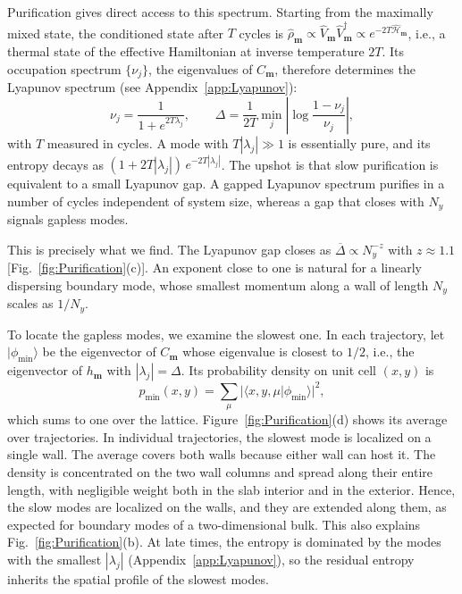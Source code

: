 \documentclass[aps,prb,twocolumn,superscriptaddress,longbibliography,floatfix]{revtex4-2}
\newcommand{\mc}[1]{\mathcal{#1}}
\newcommand{\bs}[1]{\boldsymbol{#1}}
\newcommand{\rec}{\bs m}   %
\begin{document}
Purification gives direct access to this spectrum. Starting from the maximally mixed state, the conditioned state after $T$ cycles is $\hat\rho_{\rec}\propto\hat V_{\rec}\hat V_{\rec}^\dagger\propto e^{-2T\hat{\mc H}_{\rec}}$, i.e., a thermal state of the effective Hamiltonian at inverse temperature $2T$. Its occupation spectrum $\{\nu_j\}$, the eigenvalues of $C_{\rec}$, therefore determines the Lyapunov spectrum (see Appendix~\ref{app:Lyapunov}):
\begin{equation}
    \nu_j=\frac{1}{1+e^{2T\lambda_j}},
    \qquad
    \Delta=\frac{1}{2T}\min_j\left|\log\frac{1-\nu_j}{\nu_j}\right|,
    \label{eq:LyapunovFromOccupations}
\end{equation}
with $T$ measured in cycles. A mode with $T|\lambda_j|\gg1$ is essentially pure, and its entropy decays as $(1+2T|\lambda_j|)\,e^{-2T|\lambda_j|}$. The upshot is that slow purification is equivalent to a small Lyapunov gap. A gapped Lyapunov spectrum purifies in a number of cycles independent of system size, whereas a gap that closes with $N_y$ signals gapless modes.

This is precisely what we find. The Lyapunov gap closes as $\overline{\Delta}\propto N_y^{-z}$ with $z\approx1.1$ [Fig.~\ref{fig:Purification}(c)]. An exponent close to one is natural for a linearly dispersing boundary mode, whose smallest momentum along a wall of length $N_y$ scales as $1/N_y$.

To locate the gapless modes, we examine the slowest one. In each trajectory, let $|\phi_{\min}\rangle$ be the eigenvector of $C_{\rec}$ whose eigenvalue is closest to $1/2$, i.e., the eigenvector of $h_{\rec}$ with $|\lambda_j|=\Delta$. Its probability density on unit cell $(x,y)$ is
\begin{equation}
    p_{\min}(x,y)=\sum_\mu\big|\langle x,y,\mu|\phi_{\min}\rangle\big|^2,
    \label{eq:SlowestModeDensity}
\end{equation}
which sums to one over the lattice. Figure~\ref{fig:Purification}(d) shows its average over trajectories. In individual trajectories, the slowest mode is localized on a single wall. The average covers both walls because either wall can host it. The density is concentrated on the two wall columns and spread along their entire length, with negligible weight both in the slab interior and in the exterior. Hence, the slow modes are localized on the walls, and they are extended along them, as expected for boundary modes of a two-dimensional bulk. This also explains Fig.~\ref{fig:Purification}(b). At late times, the entropy is dominated by the modes with the smallest $|\lambda_j|$ (Appendix~\ref{app:Lyapunov}), so the residual entropy inherits the spatial profile of the slowest modes.
\end{document}
